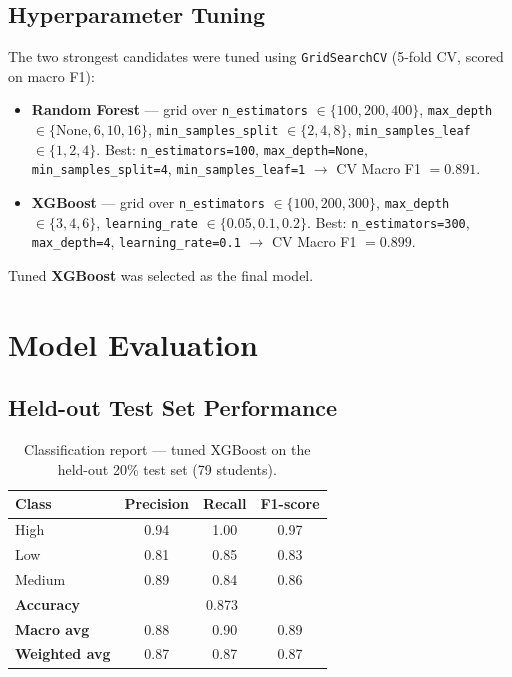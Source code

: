 \documentclass[12pt, a4paper]{article}
\begin{document}
\subsection{Hyperparameter Tuning}
The two strongest candidates were tuned using \texttt{GridSearchCV} (5-fold CV, scored on
macro F1):

\begin{itemize}[noitemsep]
    \item \textbf{Random Forest} — grid over \texttt{n\_estimators} $\in \{100,200,400\}$,
    \texttt{max\_depth} $\in \{\text{None},6,10,16\}$, \texttt{min\_samples\_split} $\in
    \{2,4,8\}$, \texttt{min\_samples\_leaf} $\in \{1,2,4\}$. Best: \texttt{n\_estimators=100},
    \texttt{max\_depth=None}, \texttt{min\_samples\_split=4}, \texttt{min\_samples\_leaf=1}
    $\to$ CV Macro F1 $= 0.891$.
    \item \textbf{XGBoost} — grid over \texttt{n\_estimators} $\in \{100,200,300\}$,
    \texttt{max\_depth} $\in \{3,4,6\}$, \texttt{learning\_rate} $\in \{0.05,0.1,0.2\}$. Best:
    \texttt{n\_estimators=300}, \texttt{max\_depth=4}, \texttt{learning\_rate=0.1} $\to$ CV
    Macro F1 $= 0.899$.
\end{itemize}

Tuned \textbf{XGBoost} was selected as the final model.

\section{Model Evaluation}

\subsection{Held-out Test Set Performance}
\begin{table}[h]
\centering
\begin{tabular}{lccc}
\toprule
\textbf{Class} & \textbf{Precision} & \textbf{Recall} & \textbf{F1-score} \\
\midrule
High   & 0.94 & 1.00 & 0.97 \\
Low    & 0.81 & 0.85 & 0.83 \\
Medium & 0.89 & 0.84 & 0.86 \\
\midrule
\textbf{Accuracy}   & \multicolumn{3}{c}{0.873} \\
\textbf{Macro avg}  & 0.88 & 0.90 & 0.89 \\
\textbf{Weighted avg} & 0.87 & 0.87 & 0.87 \\
\bottomrule
\end{tabular}
\caption{Classification report — tuned XGBoost on the held-out 20\% test set (79 students).}
\end{table}
\end{document}
